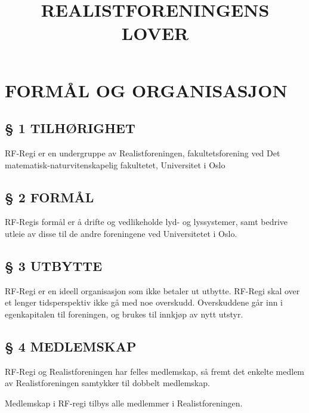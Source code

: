 \documentclass[a4paper,11pt,norsk]{scrartcl}
\title{\phantomsection%
  REALISTFORENINGENS LOVER%
  \label{realistforeningens-lover}%
  \\ %
  \DUdocumentsubtitle{Vedtatt 18. April 2018}%
  \label{vedtatt-18-april-2018}}
\author{}
\date{}
\providecommand*{\DUtransition}{%
  \hspace*{\fill}\hrulefill\hspace*{\fill}
  \vskip 0.5\baselineskip
}
\begin{document}
\maketitle

\label{contents}
\tableofcontents

\DUtransition


\section{FORMÅL OG ORGANISASJON%
  \label{formal-og-organisasjon}%
}


\subsection{§ 1 TILHØRIGHET%
  \label{tilhorighet}%
}

RF-Regi er en undergruppe av Realistforeningen, fakultetsforening ved Det matematisk-naturvitenskapelig fakultetet, Universitet i Oslo


\subsection{§ 2 FORMÅL%
  \label{formal}%
}

RF-Regis formål er å drifte og vedlikeholde lyd- og lyssystemer, samt
bedrive utleie av disse til de andre foreningene ved Universitetet i Oslo.


\subsection{§ 3 UTBYTTE%
  \label{utbytte}%
}

RF-Regi er en ideell organisasjon som ikke betaler ut utbytte.
RF-Regi skal over et lenger tidsperspektiv ikke gå med noe overskudd.
Overskuddene går inn i egenkapitalen til foreningen, og brukes
til innkjøp av nytt utstyr.


\subsection{§ 4 MEDLEMSKAP%
  \label{medlemskap}%
}

RF-Regi og Realistforeningen har felles medlemskap, så fremt det enkelte medlem av Realistforeningen samtykker til dobbelt medlemskap.

Medlemskap i RF-regi tilbys alle medlemmer i Realistforeningen.
\end{document}
